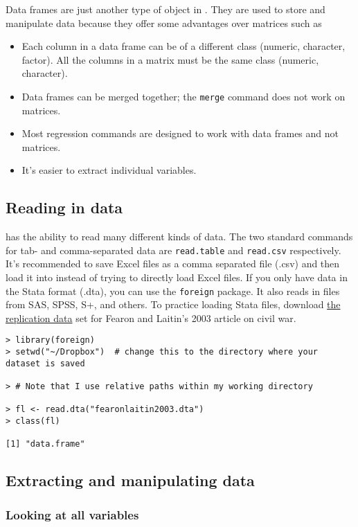 Data frames are just another type of object in \R. They are used to store and manipulate data because they offer some advantages over matrices such as 
\begin{itemize}
	\item Each column in a data frame can be of a different class (numeric, character, factor). All the columns in a matrix must be the same class (numeric, character).
	\item Data frames can be merged together; the \texttt{merge} command does not work on matrices.
	\item Most regression commands are designed to work with data frames and not matrices.
	\item It's easier to extract individual variables.
\end{itemize}

\subsection{Reading in data}

\R has the ability to read many different kinds of data. The two standard commands for tab- and comma-separated data are \texttt{read.table} and \texttt{read.csv} respectively. It's recommended to save Excel files as a comma separated file (.csv) and then load it into \R instead of trying to directly load Excel files. If you only have data in the Stata format (.dta), you can use the \texttt{foreign} package. It also reads in files from SAS, SPSS, S+, and others. To practice loading Stata files, download \href{https://web.stanford.edu/group/ethnic/publicdata/publicdata.html}{the replication data} set for Fearon and Laitin's 2003 article on civil war.

\begin{lstlisting}
> library(foreign)
> setwd("~/Dropbox")  # change this to the directory where your dataset is saved

> # Note that I use relative paths within my working directory

> fl <- read.dta("fearonlaitin2003.dta")
> class(fl)

[1] "data.frame"
\end{lstlisting}

\subsection{Extracting and manipulating data}

\subsubsection*{Looking at all variables}

